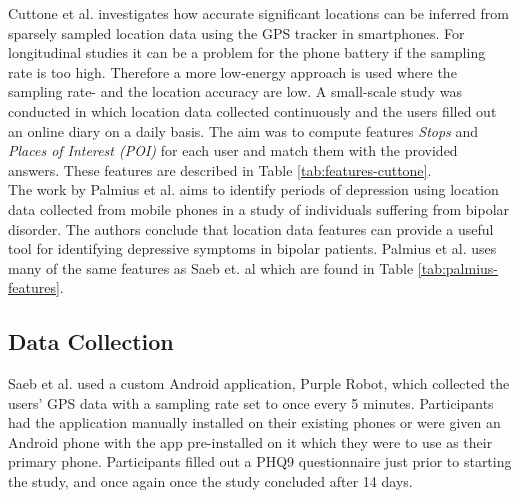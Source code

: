 


Cuttone et al. \cite{sparse-location-2014} investigates how accurate significant locations can be inferred from sparsely sampled location data using the GPS tracker in smartphones. For longitudinal studies it can be a problem for the phone battery if the sampling rate is too high. Therefore a more low-energy approach is used where the sampling rate- and the location accuracy are low. A small-scale study was conducted in which location data collected continuously and the users filled out an online diary on a daily basis. The aim was to compute features \textit{Stops} and \textit{Places of Interest (POI)} for each user and match them with the provided answers. These features are described in Table \ref{tab:features-cuttone}. \\



The work by Palmius et al. \cite{palmius2017} aims to identify periods of depression using location data collected from mobile phones in a study of individuals suffering from bipolar disorder. The authors conclude that location data features can provide a useful tool for identifying depressive symptoms in bipolar patients. Palmius et al. uses many of the same features as Saeb et. al \cite{Saeb2015, saeb2016} which are found in Table \ref{tab:palmius-features}.



\subsection{Data Collection}
Saeb et al. used a custom Android application, Purple Robot, which collected the users' GPS data with a sampling rate set to once every 5 minutes. Participants had the application manually installed on their existing phones or were given an Android phone with the app pre-installed on it which they were to use as their primary phone. Participants filled out a PHQ9 questionnaire just prior to starting the study, and once again once the study concluded after 14 days.\\



